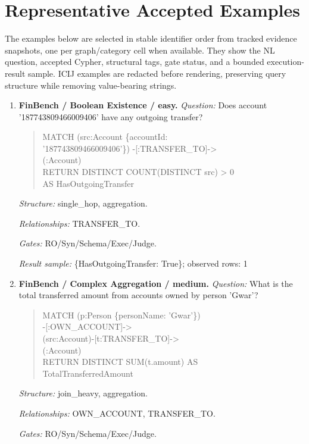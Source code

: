 \section{Representative Accepted Examples}
The examples below are selected in stable identifier order from tracked evidence snapshots, one per graph/category cell when available. They show the NL question, accepted Cypher, structural tags, gate status, and a bounded execution-result sample. ICIJ examples are redacted before rendering, preserving query structure while removing value-bearing strings.
\begin{enumerate}
\item \textbf{FinBench / Boolean Existence / easy.}
\textit{Question:} Does account '187743809466009406' have any outgoing transfer?
\begin{quote}\scriptsize\ttfamily\raggedright\sloppy
MATCH (src:Account \{accountId:\\
'187743809466009406'\}) -[:TRANSFER\_TO]-\textgreater{}\\
(:Account)\\
RETURN DISTINCT COUNT(DISTINCT src) \textgreater{} 0\\
AS HasOutgoingTransfer
\end{quote}
\textit{Structure:} single\_hop, aggregation.\par
\textit{Relationships:} TRANSFER\_TO.\par
\textit{Gates:} RO/Syn/Schema/Exec/Judge.\par
\textit{Result sample:} \{HasOutgoingTransfer: True\}; observed rows: 1
\item \textbf{FinBench / Complex Aggregation / medium.}
\textit{Question:} What is the total transferred amount from accounts owned by person 'Gwar'?
\begin{quote}\scriptsize\ttfamily\raggedright\sloppy
MATCH (p:Person \{personName: 'Gwar'\})\\
-[:OWN\_ACCOUNT]-\textgreater{}\\
(src:Account)-[t:TRANSFER\_TO]-\textgreater{}\\
(:Account)\\
RETURN DISTINCT SUM(t.amount) AS\\
TotalTransferredAmount
\end{quote}
\textit{Structure:} join\_heavy, aggregation.\par
\textit{Relationships:} OWN\_ACCOUNT, TRANSFER\_TO.\par
\textit{Gates:} RO/Syn/Schema/Exec/Judge.\par

\end{enumerate}

